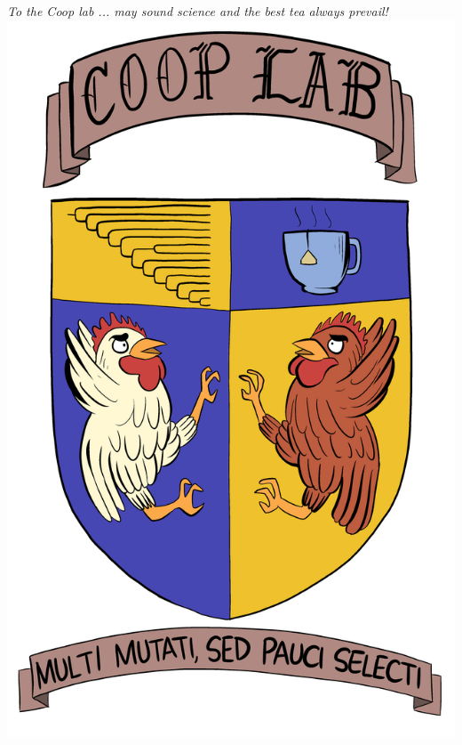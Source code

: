 % 
% 
% 
% 
%








   \frontmatter

   \pagestyle{prelim}
   
   
   \newpage
	
	
	 \thispagestyle{plain}
	 \vspace*{10em}
	 \begin{center}
	 	 \textit{To the Coop lab ... may sound science and the best tea always prevail!}\\
	 	 \vspace*{5em}
	 	\includegraphics[width=.4\textwidth]{cooplablogo2.png}
	  
	 \end{center}
	 \newpage
   
